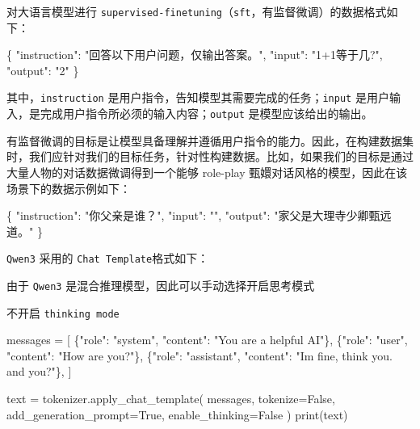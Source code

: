 \documentclass[
]{article}
\newenvironment{Shaded}{}{}
\newcommand{\BuiltInTok}[1]{\textcolor[rgb]{0.00,0.50,0.00}{#1}}
\newcommand{\DataTypeTok}[1]{\textcolor[rgb]{0.56,0.13,0.00}{#1}}
\newcommand{\FunctionTok}[1]{\textcolor[rgb]{0.02,0.16,0.49}{#1}}
\newcommand{\NormalTok}[1]{#1}
\newcommand{\OperatorTok}[1]{\textcolor[rgb]{0.40,0.40,0.40}{#1}}
\newcommand{\StringTok}[1]{\textcolor[rgb]{0.25,0.44,0.63}{#1}}
\newcommand{\VariableTok}[1]{\textcolor[rgb]{0.10,0.09,0.49}{#1}}
\begin{document}
对大语言模型进行
\texttt{supervised-finetuning}（\texttt{sft}，有监督微调）的数据格式如下：

\begin{Shaded}
\begin{Highlighting}[]
\FunctionTok{\{}
  \DataTypeTok{"instruction"}\FunctionTok{:} \StringTok{"回答以下用户问题，仅输出答案。"}\FunctionTok{,}
  \DataTypeTok{"input"}\FunctionTok{:} \StringTok{"1+1等于几?"}\FunctionTok{,}
  \DataTypeTok{"output"}\FunctionTok{:} \StringTok{"2"}
\FunctionTok{\}}
\end{Highlighting}
\end{Shaded}

其中，\texttt{instruction}
是用户指令，告知模型其需要完成的任务；\texttt{input}
是用户输入，是完成用户指令所必须的输入内容；\texttt{output}
是模型应该给出的输出。

有监督微调的目标是让模型具备理解并遵循用户指令的能力。因此，在构建数据集时，我们应针对我们的目标任务，针对性构建数据。比如，如果我们的目标是通过大量人物的对话数据微调得到一个能够
role-play 甄嬛对话风格的模型，因此在该场景下的数据示例如下：

\begin{Shaded}
\begin{Highlighting}[]
\FunctionTok{\{}
  \DataTypeTok{"instruction"}\FunctionTok{:} \StringTok{"你父亲是谁？"}\FunctionTok{,}
  \DataTypeTok{"input"}\FunctionTok{:} \StringTok{""}\FunctionTok{,}
  \DataTypeTok{"output"}\FunctionTok{:} \StringTok{"家父是大理寺少卿甄远道。"}
\FunctionTok{\}}
\end{Highlighting}
\end{Shaded}

\texttt{Qwen3} 采用的 \texttt{Chat\ Template}格式如下：

由于 \texttt{Qwen3} 是混合推理模型，因此可以手动选择开启思考模式

不开启 \texttt{thinking\ mode}

\begin{Shaded}
\begin{Highlighting}[]
\NormalTok{messages }\OperatorTok{=}\NormalTok{ [}
\NormalTok{    \{}\StringTok{"role"}\NormalTok{: }\StringTok{"system"}\NormalTok{, }\StringTok{"content"}\NormalTok{: }\StringTok{"You are a helpful AI"}\NormalTok{\},}
\NormalTok{    \{}\StringTok{"role"}\NormalTok{: }\StringTok{"user"}\NormalTok{, }\StringTok{"content"}\NormalTok{: }\StringTok{"How are you?"}\NormalTok{\},}
\NormalTok{    \{}\StringTok{"role"}\NormalTok{: }\StringTok{"assistant"}\NormalTok{, }\StringTok{"content"}\NormalTok{: }\StringTok{"I\textquotesingle{}m fine, think you. and you?"}\NormalTok{\},}
\NormalTok{]}

\NormalTok{text }\OperatorTok{=}\NormalTok{ tokenizer.apply\_chat\_template(}
\NormalTok{    messages,}
\NormalTok{    tokenize}\OperatorTok{=}\VariableTok{False}\NormalTok{,}
\NormalTok{    add\_generation\_prompt}\OperatorTok{=}\VariableTok{True}\NormalTok{,}
\NormalTok{    enable\_thinking}\OperatorTok{=}\VariableTok{False}
\NormalTok{)}
\BuiltInTok{print}\NormalTok{(text)}
\end{Highlighting}
\end{Shaded}
\end{document}
